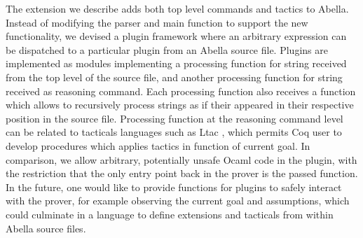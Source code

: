 \documentclass[nocopyrightspace,authoryear]{sigplanconf}
\begin{document}
The extension we describe adds both top level commands and tactics to Abella. Instead of modifying the parser and main function to support the new functionality, we devised a plugin framework where an arbitrary expression can be dispatched to a particular plugin from an Abella source file. Plugins are implemented as modules implementing a processing function for string received from the top level of the source file, and another processing function for string received as reasoning command. Each processing function also receives a function which allows to recursively process strings as if their appeared in their respective position in the source file. Processing function at the reasoning command level can be related to tacticals languages such as Ltac \cite{ltacpap}, which permits Coq user to develop procedures which applies tactics in function of current goal. In comparison, we allow arbitrary, potentially unsafe Ocaml code in the plugin, with the restriction that the only entry point back in the prover is the passed function. In the future, one would like to provide functions for plugins to safely interact with the prover, for example observing the current goal and assumptions, which could culminate in a language to define extensions and tacticals from within Abella source files. 





\end{document}
